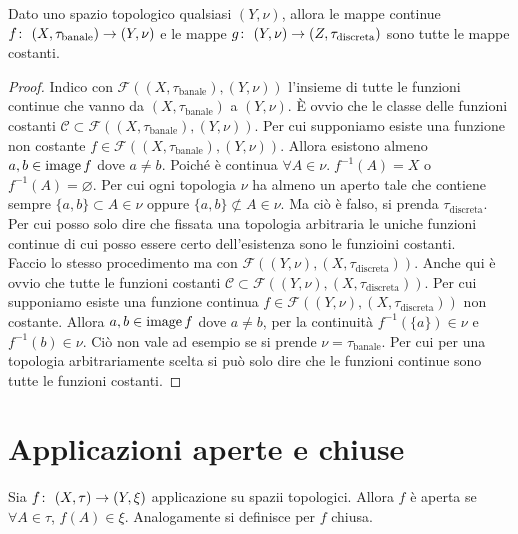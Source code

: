 \begin{theorem}
	Dato uno spazio topologico qualsiasi $(Y,\nu)$, allora le mappe continue $f \colon\ (X,\tau_{\text{banale}}) \rightarrow (Y,\nu)$ e le mappe $g \colon\ (Y,\nu) \rightarrow (Z,\tau_{\text{discreta}})$ sono tutte le mappe costanti.
\end{theorem}
\begin{proof}
	Indico con $\mathcal{F}((X,\tau_{\text{banale}}),(Y,\nu))$ l'insieme di tutte le funzioni continue che vanno da $(X,\tau_{\text{banale}})$ a $(Y,\nu)$. È ovvio che le classe delle funzioni costanti $\mathcal{C} \subset \mathcal{F}((X,\tau_{\text{banale}}),(Y,\nu))$. Per cui supponiamo esiste una funzione non costante $f \in \mathcal{F}((X,\tau_{\text{banale}}),(Y,\nu))$. Allora esistono almeno $a,b \in \operatorname{image}{f}$ dove $a \neq b$. Poiché è continua $\forall A \in \nu . \; f^{-1}(A) = X$ o $f^{-1}(A) = \varnothing$. Per cui ogni topologia $\nu$ ha almeno un aperto tale che contiene sempre $\{a,b\} \subset A \in \nu$ oppure $\{a,b\} \not\subset A \in \nu$. Ma ciò è falso, si prenda $\tau_{\text{discreta}}$. Per cui posso solo dire che fissata una topologia arbitraria le uniche funzioni continue di cui posso essere certo dell'esistenza sono le funzioini costanti. \\
	
	Faccio lo stesso procedimento ma con $\mathcal{F}((Y,\nu), (X,\tau_{\text{discreta}}))$. Anche qui è ovvio che tutte le funzioni costanti $\mathcal{C} \subset \mathcal{F}((Y,\nu), (X,\tau_{\text{discreta}}))$. Per cui supponiamo esiste una funzione continua $f \in \mathcal{F}((Y,\nu), (X,\tau_{\text{discreta}}))$ non costante. Allora $a,b \in \operatorname{image}{f}$ dove $a \neq b$, per la continuità $f^{-1}(\{a\}) \in \nu $ e $f^{-1}(b) \in \nu$. Ciò non vale ad esempio se si prende $\nu = \tau_{\text{banale}}$. Per cui per una topologia arbitrariamente scelta si può solo dire che le funzioni continue sono tutte le funzioni costanti.
\end{proof}

\section{Applicazioni aperte e chiuse}

\begin{definition}
	Sia $f \colon\ (X,\tau) \rightarrow (Y,\xi)$ applicazione su spazii topologici. Allora $f$ è aperta se $\forall A \in \tau$, $f(A) \in \xi$. Analogamente si definisce per $f$ chiusa.
\end{definition}

